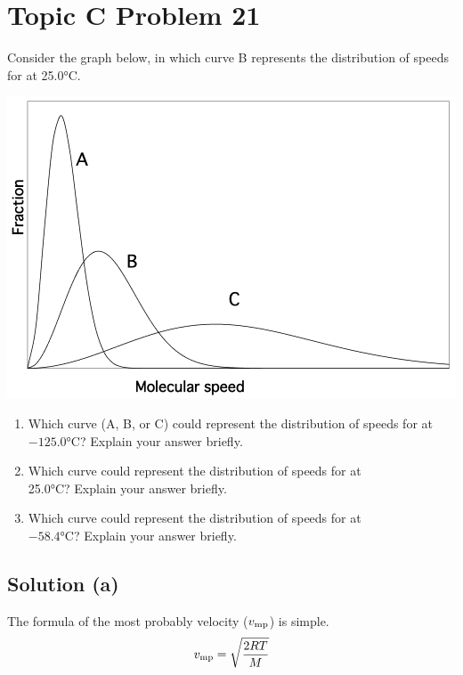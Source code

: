 \documentclass[10pt]{article}
\begin{document}
    \pagebreak
    \section{Topic C Problem 21}
        Consider the graph below, in which curve B represents the distribution of speeds for  at 25.0\unit{\celsius}.
        \begin{center}
            \includegraphics[width=\textwidth]{picture_C-21.png}
        \end{center}

        \begin{enumerate} [label=\alph*)]
            \item Which curve (A, B, or C) could represent the distribution of speeds for  at $-125.0\unit{\celsius}$? Explain your answer briefly.
            \item Which curve could represent the distribution of speeds for  at \\25.0\unit{\celsius}? Explain your answer briefly.
            \item Which curve could represent the distribution of speeds for  at \\$-58.4\unit{\celsius}$? Explain your answer briefly.
        \end{enumerate}

        \subsection{Solution (a)}
            The formula of the most probably velocity ($v_{\rm mp}$) is simple.
            \begin{equation}
                v_{\rm mp}  =   \sqrt{\frac{2RT}{M}}
            \end{equation}
\end{document}
